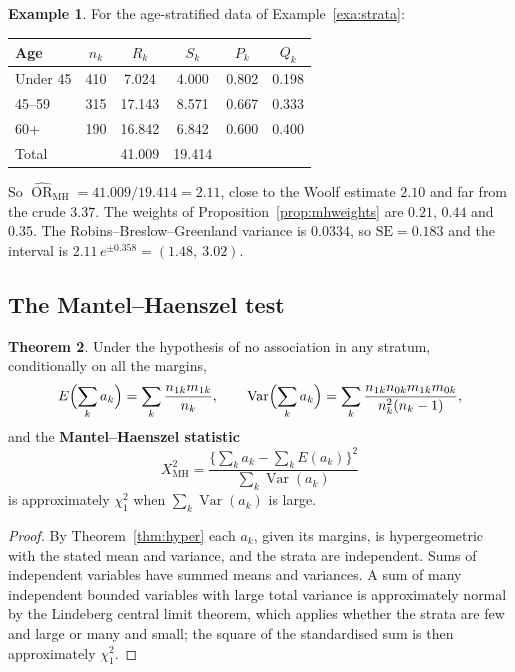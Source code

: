 \documentclass[11pt,a4paper]{article}
\numberwithin{equation}{section}
\DeclareMathOperator{\Var}{Var}
\DeclareMathOperator{\OR}{OR}
\theoremstyle{definition}
\newtheorem{thm}{Theorem}[subsection]
\newtheorem{exa}[thm]{Example}
\begin{document}
\begin{exa}
\label{exa:mhor}
For the age-stratified data of Example~\ref{exa:strata}:
\begin{center}
\begin{tabular}{lccccc}
\hline
Age & $n_k$ & $R_k$ & $S_k$ & $P_k$ & $Q_k$ \\
\hline
Under 45 & 410 & 7.024 & 4.000 & 0.802 & 0.198 \\
45--59 & 315 & 17.143 & 8.571 & 0.667 & 0.333 \\
60+ & 190 & 16.842 & 6.842 & 0.600 & 0.400 \\
\hline
Total & & 41.009 & 19.414 & & \\
\hline
\end{tabular}
\end{center}
So $\widehat{\OR}_{\text{MH}} = 41.009/19.414 = 2.11$, close to the Woolf estimate $2.10$ and far from the crude $3.37$. The weights of
Proposition~\ref{prop:mhweights} are $0.21$, $0.44$ and $0.35$. The Robins--Breslow--Greenland variance is $0.0334$, so $\text{SE} = 0.183$ and the interval is
$2.11\,e^{\pm 0.358} = (1.48,\ 3.02)$.
\end{exa}

\subsection{The Mantel--Haenszel test}

\begin{thm}
\label{thm:cmh}
Under the hypothesis of no association in any stratum, conditionally on all the margins,
\[
E\Bigl(\sum_k a_k\Bigr) = \sum_k \frac{n_{1k}m_{1k}}{n_k}, \qquad \Var\Bigl(\sum_k a_k\Bigr) = \sum_k \frac{n_{1k}n_{0k}m_{1k}m_{0k}}{n_k^2(n_k - 1)} ,
\]
and the \textbf{Mantel--Haenszel statistic}
\[
X^2_{\text{MH}} = \frac{\bigl\{\sum_k a_k - \sum_k E(a_k)\bigr\}^2}{\sum_k \Var(a_k)}
\]
is approximately $\chi^2_1$ when $\sum_k \Var(a_k)$ is large.
\end{thm}

\begin{proof}
By Theorem~\ref{thm:hyper} each $a_k$, given its margins, is hypergeometric with the stated mean and variance, and the strata are independent.
Sums of independent variables have summed means and variances. A sum of many independent bounded variables with large total variance is
approximately normal by the Lindeberg central limit theorem, which applies whether the strata are few and large or many and small; the
square of the standardised sum is then approximately $\chi^2_1$.
\end{proof}
\end{document}

